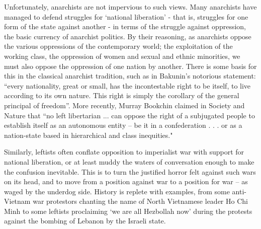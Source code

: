 Unfortunately, anarchists are not impervious to such views. Many anarchists have managed to defend struggles for ‘national liberation’ - that is, struggles for one form of the state against another - in terms of the struggle against oppression, the basic currency of anarchist politics. By their reasoning, as anarchists oppose the various oppressions of the contemporary world; the exploitation of the working class, the oppression of women and sexual and ethnic minorities, we must also oppose the oppression of one nation by another. There is some basis for this in the classical anarchist tradition, such as in Bakunin’s notorious statement: “every nationality, great or small, has the incontestable right to be itself, to live according to its own nature. This right is simply the corollary of the general principal of freedom”. More recently, Murray Bookchin claimed in Society and Nature that “no left libertarian ... can oppose the right of a subjugated people to establish itself as an autonomous entity -- be it in a confederation . . . or as a nation-state based in hierarchical and class inequities."

Similarly, leftists often conflate opposition to imperialist war with support for national liberation, or at least muddy the waters of conversation enough to make the confusion inevitable. This is to turn the justified horror felt against such wars on its head, and to move from a position against war to a position for war – as waged by the underdog side. History is replete with examples, from some anti-Vietnam war protestors chanting the name of North Vietnamese leader Ho Chi Minh to some leftists proclaiming ‘we are all Hezbollah now’ during the protests against the bombing of Lebanon by the Israeli state.

